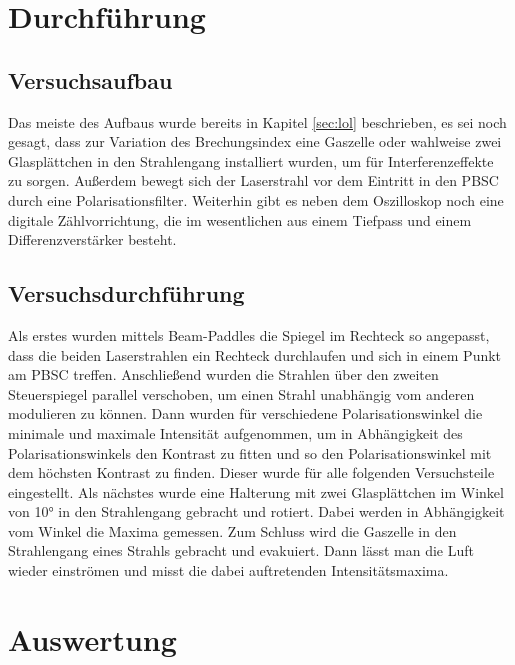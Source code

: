 \section{Durchführung}
  \subsection{Versuchsaufbau}
  Das meiste des Aufbaus wurde bereits in Kapitel \ref{sec:lol} beschrieben,
  es sei noch gesagt, dass zur Variation des Brechungsindex eine Gaszelle
  oder wahlweise zwei Glasplättchen in den Strahlengang installiert wurden, um
  für Interferenzeffekte zu sorgen. Außerdem bewegt sich der Laserstrahl vor dem Eintritt
  in den PBSC durch eine Polarisationsfilter. Weiterhin gibt es neben dem Oszilloskop
  noch eine digitale Zählvorrichtung, die im wesentlichen aus einem Tiefpass und einem
  Differenzverstärker besteht.
  \subsection{Versuchsdurchführung}
  Als erstes wurden mittels Beam-Paddles die Spiegel im Rechteck so angepasst,
  dass die beiden Laserstrahlen ein Rechteck durchlaufen und sich in einem
  Punkt am PBSC treffen. Anschließend wurden die Strahlen über den zweiten
  Steuerspiegel parallel verschoben, um einen Strahl unabhängig vom anderen modulieren
  zu können. Dann wurden für verschiedene Polarisationswinkel die
  minimale und maximale Intensität aufgenommen, um in Abhängigkeit des Polarisationswinkels
  den Kontrast zu fitten und so den Polarisationswinkel mit dem höchsten Kontrast
  zu finden. Dieser wurde für alle folgenden Versuchsteile eingestellt. Als nächstes
  wurde eine Halterung mit zwei Glasplättchen im Winkel von 10° in den Strahlengang gebracht
  und rotiert. Dabei werden in Abhängigkeit vom Winkel die Maxima gemessen. Zum
  Schluss wird die Gaszelle in den Strahlengang eines Strahls gebracht und evakuiert.
  Dann lässt man die Luft wieder einströmen und misst die dabei auftretenden
  Intensitätsmaxima.
\section{Auswertung}

